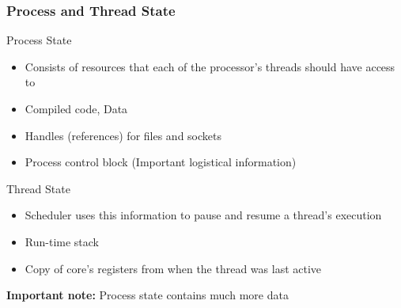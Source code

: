 \documentclass{beamer}
\begin{document}
\begin{frame}
\frametitle{Process and Thread State}

Process State

\begin{itemize}
	\item[] Consists of resources that each of the processor's threads should have access to
	\item Compiled code, Data
	\item Handles (references) for files and sockets
	\item Process control block (Important logistical information)
\end{itemize}

Thread State

\begin{itemize}
	\item[] Scheduler uses this information to pause and resume a thread's execution
	\item Run-time stack
	\item Copy of core's registers from when the thread was last active
\end{itemize}

\textbf{Important note:} Process state contains much more data

\end{frame}
\end{document}
